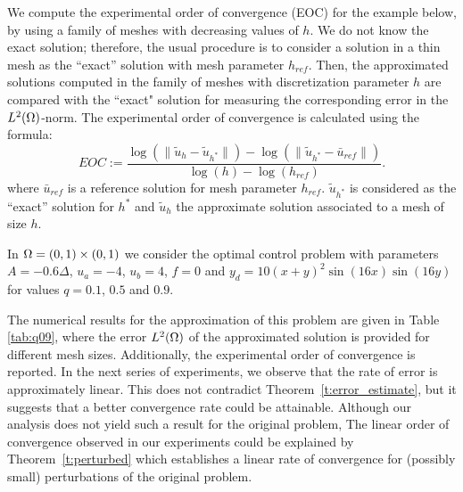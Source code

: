 {We compute the experimental order of convergence (EOC) for the example below, by using a family of meshes with decreasing values of $h$. We do not know the exact solution; therefore, the usual procedure is to consider a solution in a thin mesh as the ``exact'' solution with mesh parameter $h_{ref}$. Then, the approximated solutions computed in the family of meshes with discretization parameter $h$ are compared with the ``exact"  solution for measuring the corresponding error in the $L^2(\Omega)$-norm. 
%
The experimental order of convergence  is calculated using the formula:
\begin{equation*}%
	EOC:=\frac{\log(\|\tilde{u}_{h}-\tilde{u}_{h^*}\|)-\log(\|\tilde{u}_{h^*}-\bar{u}_{ref}\|)}{\log(h)-\log(h_{ref})}. 
\end{equation*}
where $\bar u_{ref}$ is a reference solution for mesh parameter $h_{ref}$. $\tilde u_{h^*}$ is considered as the ``exact'' solution for $h^*$  and $\tilde{u}_h$ the approximate  solution associated to a mesh of size $h$. 
%
\begin{example}
In $\Omega =(0,1)\times (0,1)$ we consider the optimal control problem with parameters $A=-0.6\Delta$, $u_a=-4$, $u_b = 4$, $f=0$ and $y_d = 10(x+y)^2 \sin(16x)\sin(16y)$ for values  $q=0.1$, $0.5$ and $0.9$.
\end{example}

The numerical results for the approximation of this problem are given in Table \ref{tab:q09}, where the error $L^2(\Omega)$ of the approximated solution is provided for different mesh sizes. Additionally, the experimental order of convergence is reported. In the next series of experiments, we observe that the rate of error is approximately linear.  This does not contradict Theorem~\ref{t:error_estimate}, but it suggests that 
a better convergence rate could be attainable. Although our analysis does not yield such a result for the original problem, The linear order of convergence observed in our experiments could be explained by Theorem~\ref{t:perturbed} which
establishes a linear rate of convergence for (possibly small) perturbations of the original problem.
\vspace{5mm}


}

